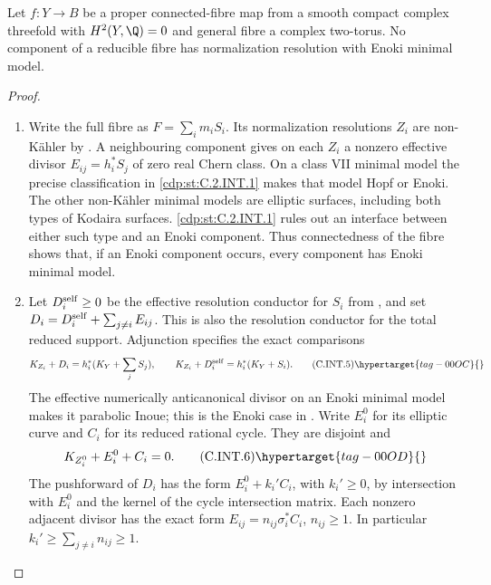 \begin{proposition}\hypertarget{tag-01C1}{}\label{cdp:st:C.2.INT.2}


Let $f:Y\to B$ be a proper connected-fibre map from a
smooth compact complex threefold with $H^2(Y,\Q)=0$
and general fibre a complex two-torus. No component
of a reducible fibre has normalization resolution
with Enoki minimal model.
\end{proposition}


\begin{proof}

\begin{enumerate}[label={$\langle1\rangle$\arabic*.},leftmargin=*]
\item Write the full fibre as $F=\sum_i m_iS_i$. Its
normalization resolutions $Z_i$ are non-K\"ahler by
. A neighbouring component gives on each $Z_i$
a nonzero effective divisor $E_{ij}=h_i^*S_j$ of
zero real Chern class. On a class VII minimal model
the precise classification in \ref{cdp:st:C.2.INT.1} makes that
model Hopf or Enoki. The other non-K\"ahler minimal
models are elliptic surfaces, including both types
of Kodaira surfaces. \ref{cdp:st:C.2.INT.1} rules out an interface
between either such type and an Enoki component.
Thus connectedness of the fibre shows that, if an
Enoki component occurs, every component has Enoki
minimal model.

\item Let $D_i^{\rm self}\ge0$ be the effective resolution
conductor for $S_i$ from , and set
$D_i=D_i^{\rm self}+\sum_{j\ne i}E_{ij}$. This is
also the resolution conductor for the total reduced
support. Adjunction specifies the exact comparisons
\[
 K_{Z_i}+D_i=h_i^*(K_Y+\sum_j S_j),\qquad
 K_{Z_i}+D_i^{\rm self}=h_i^*(K_Y+S_i).
 \tag{C.INT.5}\hypertarget{tag-00OC}{}\label{cdp:eq:C.INT.5}
\]
The effective numerically anticanonical divisor on
an Enoki minimal model makes it parabolic Inoue;
this is the Enoki case in
\cite[Lemma~2.22 and the following paragraph]{Dloussky2006}.
Write $E_i^0$ for its elliptic curve and $C_i$ for
its reduced rational cycle. They are disjoint and
\[
 K_{Z_i^0}+E_i^0+C_i=0.
 \tag{C.INT.6}\hypertarget{tag-00OD}{}\label{cdp:eq:C.INT.6}
\]
The pushforward of $D_i$ has the form
$E_i^0+k_i' C_i$, with $k_i'\ge0$, by intersection
with $E_i^0$ and the kernel of the cycle intersection
matrix. Each nonzero adjacent divisor has the exact
form $E_{ij}=n_{ij}\sigma_i^*C_i$, $n_{ij}\ge1$.
In particular $k_i'\ge\sum_{j\ne i}n_{ij}\ge1$.


\end{enumerate}
\end{proof}
